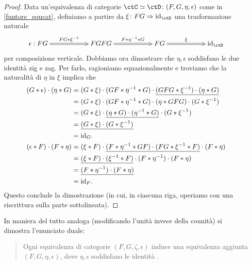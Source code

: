 \begin{proof}
 Data un'equivalenza di categorie \(\ctC\simeq\ctD \colon (F,G,\eta,\epsilon)\) come in \ref{funtore_equcat}, definiamo a partire da \(\xi \colon FG\nat \Id[\ctD]\) una trasformazione naturale
 \[\xymatrix@C=2cm{
  \epsilon : FG \ar@{=>}[r]^-{FG\whi \xi^{-1}} & FGFG \ar@{=>}[r]^-{F\whi\eta^{-1}\whi G} & FG \ar@{=>}[r]^-\xi & \Id[\ctD]
  }\]
 per composizione verticale. Dobbiamo ora dimostrare che \(\eta,\epsilon\) soddisfano le due identità zig e zag. Per farlo, ragioniamo equazionalmente e troviamo che la naturalità di \(\eta\) in \(\xi\) implica che
 \begin{align*}
  (G\whi\epsilon)\cmp(\eta \whi G) & = (G\whi\xi )\cmp(GF\whi\eta^{-1}\whi G)\cmp\underline{(GFG\whi\xi^{-1})\cmp(\eta\whi G)}      \\
                                   & = (G\whi\xi )\cmp(GF\whi\eta^{-1}\whi G)\cmp(\eta\whi GFG)\cmp(G\whi \xi^{-1})                 \\
                                   & = (G\whi\xi )\cmp\underline{(\eta\whi G)\cmp(\eta^{-1}\whi G)}\cmp(G\whi \xi^{-1})             \\
                                   & = \underline{(G\whi\xi )\cmp(G\whi \xi^{-1})}                                                  \\
                                   & =\Id[G].                                                                                       \\
  (\epsilon\whi F)\cmp(F\whi\eta)  & = (\xi\whi F)\cmp\underline{(F\whi\eta^{-1}\whi GF)\cmp(FG\whi \xi^{-1}\whi F)}\cmp(F\whi\eta) \\
                                   & = \underline{(\xi\whi F)\cmp(\xi^{-1}\whi F)}\cmp(F\whi\eta^{-1})\cmp(F\whi\eta)               \\
                                   & = \underline{(F\whi\eta^{-1})\cmp(F\whi\eta)}                                                  \\
                                   & = \Id[F].
 \end{align*}
 Questo conclude la dimostrazione (in cui, in ciascuna riga, operiamo con una riscrittura sulla parte sottolineata).
\end{proof}
In maniera del tutto analoga (modificando l'unità invece della counità) si dimostra l'enunciato duale:
\begin{quote}
 Ogni equivalenza di categorie \((F,G,\zeta,\epsilon)\) induce una equivalenza aggiunta \((F,G,\eta,\epsilon)\), dove \(\eta,\epsilon\) soddisfano le identità \zzg.
\end{quote}
